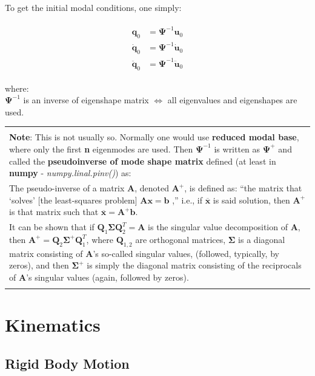 \documentclass[10pt,b5paper,titlepage]{book}
\newenvironment{bbox}[1][0.96]
{
    \begin{center}
        \begin{tabular}{|p{#1\textwidth}|}
            \hline\\
}
{
            \\\\\hline
        \end{tabular}
    \end{center}
}
\newenvironment{eqarray}
{
    \begin{eqnarray}
        \begin{aligned}
}
{
        \end{aligned}
    \end{eqnarray}
}
\begin{document}
To get the initial modal conditions, one simply:

\begin{eqarray}
    \mathbf{q}_0 &= \mathbf{\Psi}^{-1} \mathbf{u}_0 \\
    \mathbf{\dot{q}}_0 &= \mathbf{\Psi}^{-1} \mathbf{\dot{u}}_0 \\
    \mathbf{\ddot{q}}_0 &= \mathbf{\Psi}^{-1} \mathbf{\ddot{u}}_0
\end{eqarray}

where:\\
$ \mathbf{\Psi}^{-1} $ is an inverse of eigenshape matrix $ \Leftrightarrow $ all eigenvalues
and eigenshapes are used.

\begin{bbox}[0.96]
    \textbf{Note}: This is not usually so. Normally one would use
    \textbf{reduced modal base}, where only the first \textbf{n} eigenmodes are used. Then
    $ \mathbf{\Psi}^{-1} $ is written as $ \mathbf{\Psi}^{+} $ and called the
    \textbf{pseudoinverse of mode shape matrix} defined (at least in \textbf{numpy}
    - \textit{numpy.linal.pinv()}) as:\\

    \smallskip
    The pseudo-inverse of a matrix $ \mathbf{A} $, denoted $ \mathbf{A}^{+} $,
    is defined as: “the matrix that ‘solves’ [the least-squares problem]
    $ \mathbf{A} \mathbf{x} = \mathbf{b} $ ,” i.e., if $ \overline{\mathbf{x}} $
    is said solution, then $ \mathbf{A}^{+} $ is that matrix such that
    $ \overline{\mathbf{x}} = \mathbf{A}^{+} \mathbf{b} $.\\

    \smallskip
    It can be shown that if $ \mathbf{Q}_1 \mathbf{\Sigma} \mathbf{Q}_2^T = \mathbf{A} $
    is the singular value decomposition of $ \mathbf{A} $, then
    $ \mathbf{A}^{+} = \mathbf{Q}_2 \mathbf{\Sigma}^{+} \mathbf{Q}_1^T $, where $ \mathbf{Q}_{1,2} $
    are orthogonal matrices, $ \mathbf{\Sigma} $  is a diagonal matrix consisting of
    $ \mathbf{A} $’s so-called singular values, (followed, typically, by zeros),
    and then $ \mathbf{\Sigma}^{+} $ is simply the diagonal matrix consisting
    of the reciprocals of $ \mathbf{A} $’s singular values (again, followed
    by zeros).
\end{bbox}



\chapter{Kinematics}
\section{Rigid Body Motion}
\end{document}
